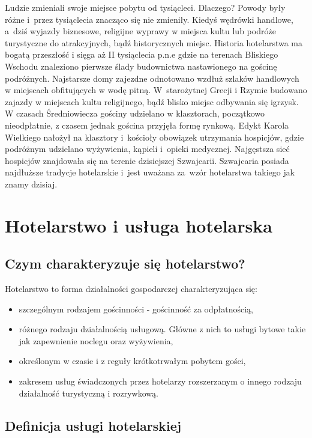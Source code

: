 \documentclass[a4paper,onecolumn,oneside,11pt,wide,floatssmall]{mwrep}
\theoremstyle{definition}
\theoremstyle{plain}%
\theoremstyle{remark}
\begin{document}
Ludzie zmieniali swoje miejsce pobytu od tysiącleci. Dlaczego? Powody były różne 
\mbox{i przez} tysiąclecia znacząco się nie zmieniły. Kiedyś wędrówki handlowe, \mbox{a 
dziś} wyjazdy biznesowe, religijne wyprawy w miejsca kultu lub podróże 
turystyczne do atrakcyjnych, bądź historycznych miejsc. Historia 
hotelarstwa ma bogatą przeszłość i sięga aż II tysiąclecia p.n.e gdzie na 
terenach Bliskiego Wschodu znaleziono pierwsze ślady budownictwa 
nastawionego na gościnę podróżnych. Najstarsze domy zajezdne odnotowano 
wzdłuż szlaków handlowych w miejscach obfitujących w wodę pitną. \mbox{W 
starożytnej} Grecji i Rzymie budowano zajazdy w miejscach kultu religijnego, 
bądź blisko miejsc odbywania się igrzysk. W czasach Średniowiecza gościny udzielano 
w klasztorach, początkowo nieodpłatnie, z czasem jednak gościna przyjęła 
formę rynkową. Edykt Karola Wielkiego nałożył na klasztory \mbox{i kościoły} 
obowiązek utrzymania hospicjów, gdzie podróżnym udzielano wyżywienia, 
kąpieli \mbox{i opieki} medycznej. Najgęstsza sieć hospicjów znajdowała się na 
terenie dzisiejszej Szwajcarii. Szwajcaria posiada najdłuższe tradycje 
hotelarskie \mbox{i jest} uważana \mbox{za wzór} hotelarstwa takiego jak znamy dzisiaj.


\section{Hotelarstwo i usługa hotelarska}

\subsection{Czym charakteryzuje się hotelarstwo?}

Hotelarstwo to forma działalności gospodarczej charakteryzująca się:
\begin{itemize} 
  \item szczególnym rodzajem gościnności - gościnność za odpłatnością,
  \item różnego rodzaju działalnością usługową. Główne z 
  nich to usługi bytowe takie jak zapewnienie noclegu oraz wyżywienia,
  \item określonym w czasie i z reguły krótkotrwałym pobytem gości,  
  \item zakresem usług świadczonych przez hotelarzy rozszerzanym o innego rodzaju działalność turystyczną i rozrywkową.
\end{itemize}

\subsection{Definicja usługi hotelarskiej}
\end{document}
